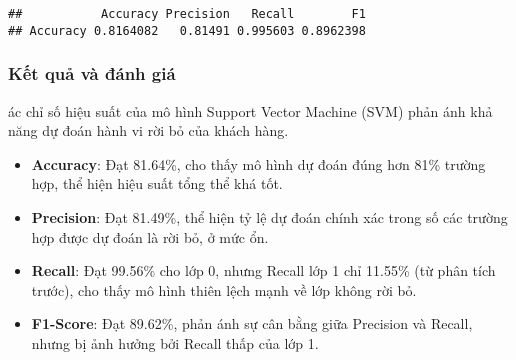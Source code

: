\documentclass[
]{article}
\newenvironment{Shaded}{\begin{snugshade}}{\end{snugshade}}
\newcommand{\AttributeTok}[1]{\textcolor[rgb]{0.13,0.29,0.53}{#1}}
\newcommand{\ConstantTok}[1]{\textcolor[rgb]{0.56,0.35,0.01}{#1}}
\newcommand{\FunctionTok}[1]{\textcolor[rgb]{0.13,0.29,0.53}{\textbf{#1}}}
\newcommand{\NormalTok}[1]{#1}
\newcommand{\OtherTok}[1]{\textcolor[rgb]{0.56,0.35,0.01}{#1}}
\newcommand{\SpecialCharTok}[1]{\textcolor[rgb]{0.81,0.36,0.00}{\textbf{#1}}}
\newcommand{\StringTok}[1]{\textcolor[rgb]{0.31,0.60,0.02}{#1}}
\providecommand{\tightlist}{%
  \setlength{\itemsep}{0pt}\setlength{\parskip}{0pt}}
\begin{document}
\begin{Shaded}
\end{Shaded}

\begin{verbatim}
##           Accuracy Precision   Recall        F1
## Accuracy 0.8164082   0.81491 0.995603 0.8962398
\end{verbatim}

\subsubsection{Kết quả và đánh giá}\label{sec-svm-results}

ác chỉ số hiệu suất của mô hình Support Vector Machine (SVM) phản ánh
khả năng dự đoán hành vi rời bỏ của khách hàng.

\begin{itemize}
\tightlist
\item
  \textbf{Accuracy}: Đạt 81.64\%, cho thấy mô hình dự đoán đúng hơn 81\%
  trường hợp, thể hiện hiệu suất tổng thể khá tốt.
\item
  \textbf{Precision}: Đạt 81.49\%, thể hiện tỷ lệ dự đoán chính xác
  trong số các trường hợp được dự đoán là rời bỏ, ở mức ổn.
\item
  \textbf{Recall}: Đạt 99.56\% cho lớp 0, nhưng Recall lớp 1 chỉ 11.55\%
  (từ phân tích trước), cho thấy mô hình thiên lệch mạnh về lớp không
  rời bỏ.
\item
  \textbf{F1-Score}: Đạt 89.62\%, phản ánh sự cân bằng giữa Precision và
  Recall, nhưng bị ảnh hưởng bởi Recall thấp của lớp 1.
\end{itemize}
\end{document}
